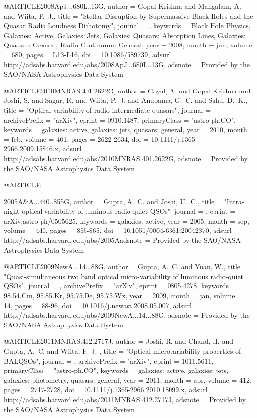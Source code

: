 \documentclass[twocolumn]{aastex62}
\begin{document}
{{@ARTICLE{2008ApJ...680L..13G,
   author = {{Gopal-Krishna} and {Mangalam}, A. and {Wiita}, P.~J.},
    title = "{Stellar Disruption by Supermassive Black Holes and the Quasar Radio Loudness Dichotomy}",
  journal = {\apjl},
 keywords = {Black Hole Physics, Galaxies: Active, Galaxies: Jets, Galaxies: Quasars: Absorption Lines, Galaxies: Quasars: General, Radio Continuum: General},
     year = 2008,
    month = jun,
   volume = 680,
    pages = {L13-L16},
      doi = {10.1086/589739},
   adsurl = {http://adsabs.harvard.edu/abs/2008ApJ...680L..13G},
  adsnote = {Provided by the SAO/NASA Astrophysics Data System}
}

@ARTICLE{2010MNRAS.401.2622G,
   author = {{Goyal}, A. and {Gopal-Krishna} and {Joshi}, S. and {Sagar}, R. and 
	{Wiita}, P.~J. and {Anupama}, G.~C. and {Sahu}, D.~K.},
    title = "{Optical variability of radio-intermediate quasars}",
  journal = {\mnras},
archivePrefix = "arXiv",
   eprint = {0910.1487},
 primaryClass = "astro-ph.CO",
 keywords = {galaxies: active, galaxies: jets, quasars: general},
     year = 2010,
    month = feb,
   volume = 401,
    pages = {2622-2634},
      doi = {10.1111/j.1365-2966.2009.15846.x},
   adsurl = {http://adsabs.harvard.edu/abs/2010MNRAS.401.2622G},
  adsnote = {Provided by the SAO/NASA Astrophysics Data System}
}

@ARTICLE{2005A&A...440..855G,
   author = {{Gupta}, A.~C. and {Joshi}, U.~C.},
    title = "{Intra-night optical variability of luminous radio-quiet QSOs}",
  journal = {\aap},
   eprint = {arXiv:astro-ph/0505625},
 keywords = {galaxies: active},
     year = 2005,
    month = sep,
   volume = 440,
    pages = {855-865},
      doi = {10.1051/0004-6361:20042370},
   adsurl = {http://adsabs.harvard.edu/abs/2005Aadsnote = {Provided by the SAO/NASA Astrophysics Data System}
}


@ARTICLE{2009NewA...14...88G,
   author = {{Gupta}, A.~C. and {Yuan}, W.},
    title = "{Quasi-simultaneous two band optical micro-variability of luminous radio-quiet QSOs}",
  journal = {\na},
archivePrefix = "arXiv",
   eprint = {0805.4278},
 keywords = {98.54.Cm, 95.85.Kr, 95.75.De, 95.75.Wx},
     year = 2009,
    month = jan,
   volume = 14,
    pages = {88-96},
      doi = {10.1016/j.newast.2008.05.007},
   adsurl = {http://adsabs.harvard.edu/abs/2009NewA...14...88G},
  adsnote = {Provided by the SAO/NASA Astrophysics Data System}
}

@ARTICLE{2011MNRAS.412.2717J,
   author = {{Joshi}, R. and {Chand}, H. and {Gupta}, A.~C. and {Wiita}, P.~J.
	},
    title = "{Optical microvariability properties of BALQSOs}",
  journal = {\mnras},
archivePrefix = "arXiv",
   eprint = {1011.5611},
 primaryClass = "astro-ph.CO",
 keywords = {galaxies: active, galaxies: jets, galaxies: photometry, quasars: general},
     year = 2011,
    month = apr,
   volume = 412,
    pages = {2717-2728},
      doi = {10.1111/j.1365-2966.2010.18099.x},
   adsurl = {http://adsabs.harvard.edu/abs/2011MNRAS.412.2717J},
  adsnote = {Provided by the SAO/NASA Astrophysics Data System}
}

}}}
\end{document}
